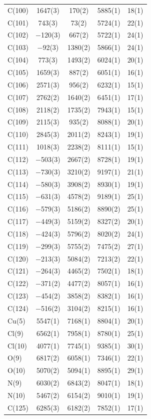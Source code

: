 \begin{center}
{\begin{supertabular}{lcccc}
C(100)&1647(3)&170(2)&5885(1)&18(1)\\
C(101)&743(3)&73(2)&5724(1)&22(1)\\
C(102)&$-$120(3)&667(2)&5722(1)&24(1)\\
C(103)&$-$92(3)&1380(2)&5866(1)&24(1)\\
C(104)&773(3)&1493(2)&6024(1)&20(1)\\
C(105)&1659(3)&887(2)&6051(1)&16(1)\\
C(106)&2571(3)&956(2)&6232(1)&15(1)\\
C(107)&2762(2)&1640(2)&6451(1)&17(1)\\
C(108)&2118(2)&1735(2)&7943(1)&15(1)\\
C(109)&2115(3)&935(2)&8088(1)&20(1)\\
C(110)&2845(3)&2011(2)&8243(1)&19(1)\\
C(111)&1018(3)&2238(2)&8111(1)&15(1)\\
C(112)&$-$503(3)&2667(2)&8728(1)&19(1)\\
C(113)&$-$730(3)&3210(2)&9197(1)&21(1)\\
C(114)&$-$580(3)&3908(2)&8930(1)&19(1)\\
C(115)&$-$631(3)&4578(2)&9189(1)&25(1)\\
C(116)&$-$579(3)&5186(2)&8890(2)&25(1)\\
C(117)&$-$449(3)&5159(2)&8327(2)&20(1)\\
C(118)&$-$424(3)&5796(2)&8020(2)&24(1)\\
C(119)&$-$299(3)&5755(2)&7475(2)&27(1)\\
C(120)&$-$213(3)&5084(2)&7213(2)&22(1)\\
C(121)&$-$264(3)&4465(2)&7502(1)&18(1)\\
C(122)&$-$371(2)&4477(2)&8057(1)&16(1)\\
C(123)&$-$454(2)&3858(2)&8382(1)&16(1)\\
C(124)&$-$516(2)&3104(2)&8215(1)&16(1)\\
Cu(5)&5547(1)&7168(1)&8804(1)&20(1)\\
Cl(9)&6562(1)&7958(1)&8780(1)&25(1)\\
Cl(10)&4077(1)&7745(1)&9385(1)&30(1)\\
O(9)&6817(2)&6058(1)&7346(1)&22(1)\\
O(10)&5070(2)&5094(1)&8895(1)&29(1)\\
N(9)&6030(2)&6843(2)&8047(1)&18(1)\\
N(10)&5467(2)&6154(2)&9010(1)&19(1)\\
C(125)&6285(3)&6182(2)&7852(1)&17(1)\\

\end{supertabular}}
\end{center}
